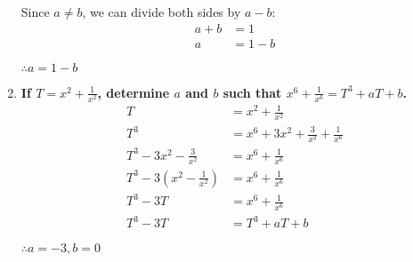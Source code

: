 \documentclass[12pt]{article}
\begin{document}
\begin{enumerate}
    Since $a \neq b$, we can divide both sides by $a-b$:
    \begin{align*}
        a+b &= 1 \\
        a & = 1 - b
    \end{align*}
    
    $\therefore a = 1-b$

    \item \textbf{If $T = x^2 + \frac{1}{x^2}$, determine $a$ and $b$ such that $x^6 + \frac{1}{x^6} = T^3 + aT + b$.}
    \begin{align*}
        T &= x^2+\frac{1}{x^2} \\
        T^3 &= x^6+3x^2+\frac{3}{x^2}+\frac{1}{x^6} \\
        T^3-3x^2-\frac{3}{x^2} &= x^6+\frac{1}{x^6} \\
        T^3-3(x^2-\frac{1}{x^2}) &= x^6+\frac{1}{x^6} \\
        T^3-3T &= x^6+\frac{1}{x^6} \\
        T^3-3T &= T^3+aT+b
    \end{align*}
    
    $\therefore a = -3, b = 0$ 
    
\end{enumerate}
\end{document}
